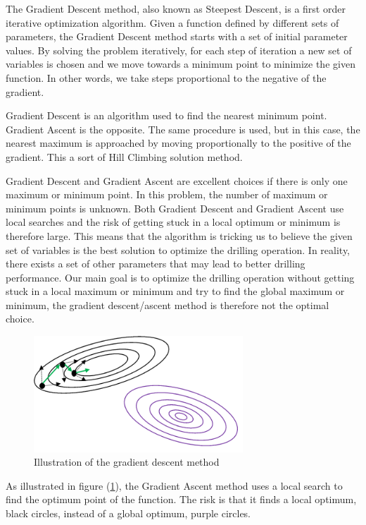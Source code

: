 The Gradient Descent method, also known as Steepest Descent, is a first order iterative optimization algorithm. Given a function defined by different sets of parameters, the Gradient Descent method starts with a set of initial parameter values. By solving the problem iteratively, for each step of iteration a new set of variables is chosen and we move towards a minimum point to minimize the given function. In other words, we take steps proportional to the negative of the gradient. 

Gradient Descent is an algorithm used to find the nearest minimum point. Gradient Ascent is the opposite. The same procedure is used, but in this case, the nearest maximum is approached by moving proportionally to the positive of the gradient. This a sort of Hill Climbing solution method. 

Gradient Descent and Gradient Ascent are excellent choices if there is only one maximum or minimum point. In this problem, the number of maximum or minimum points is unknown. 
Both Gradient Descent and Gradient Ascent use local searches and the risk of getting stuck in a local optimum or minimum is therefore large. This means that the algorithm is tricking us to believe the given set of variables is the best solution to optimize the drilling operation. In reality, there exists a set of other parameters that may lead to better drilling performance. Our main goal is to optimize the drilling operation without getting stuck in a local maximum or minimum and try to find the global maximum or minimum, the gradient descent/ascent method is therefore not the optimal choice.


\begin{figure} [H]
\centering
\includegraphics[width=0.7\textwidth]{figures/gradientdescentmethod.png}
\caption{Illustration of the gradient descent method}
\label{fig:gradientdm}
\end{figure}

As illustrated in figure (\ref{fig:gradientdm}), the Gradient Ascent method uses a local search to find the optimum point of the function. The risk is that it finds a local optimum, black circles, instead of a global optimum, purple circles.

